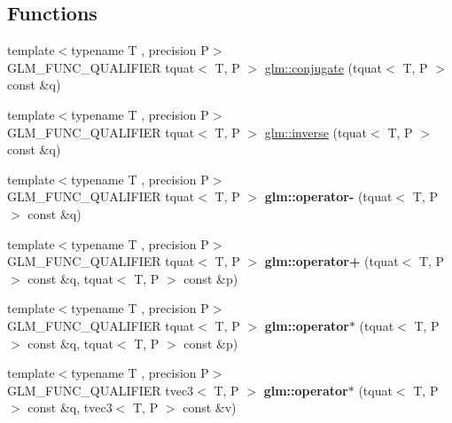 \subsection*{Functions}
\begin{DoxyCompactItemize}
\item 
{\footnotesize template$<$typename T , precision P$>$ }\\G\-L\-M\-\_\-\-F\-U\-N\-C\-\_\-\-Q\-U\-A\-L\-I\-F\-I\-E\-R tquat$<$ T, P $>$ \hyperlink{group__gtc__quaternion_gab1ace864fbf189ffa368950001808a3c}{glm\-::conjugate} (tquat$<$ T, P $>$ const \&q)
\item 
{\footnotesize template$<$typename T , precision P$>$ }\\G\-L\-M\-\_\-\-F\-U\-N\-C\-\_\-\-Q\-U\-A\-L\-I\-F\-I\-E\-R tquat$<$ T, P $>$ \hyperlink{group__gtc__quaternion_ga5f47300c024c2d809944e6ac661d6d14}{glm\-::inverse} (tquat$<$ T, P $>$ const \&q)
\item 
\hypertarget{group__gtc__quaternion_ga64cdb5fcebb192579798cfe79670239f}{{\footnotesize template$<$typename T , precision P$>$ }\\G\-L\-M\-\_\-\-F\-U\-N\-C\-\_\-\-Q\-U\-A\-L\-I\-F\-I\-E\-R tquat$<$ T, P $>$ {\bfseries glm\-::operator-\/} (tquat$<$ T, P $>$ const \&q)}\label{group__gtc__quaternion_ga64cdb5fcebb192579798cfe79670239f}

\item 
\hypertarget{group__gtc__quaternion_ga517657374d8ca180d63c33ff9430518a}{{\footnotesize template$<$typename T , precision P$>$ }\\G\-L\-M\-\_\-\-F\-U\-N\-C\-\_\-\-Q\-U\-A\-L\-I\-F\-I\-E\-R tquat$<$ T, P $>$ {\bfseries glm\-::operator+} (tquat$<$ T, P $>$ const \&q, tquat$<$ T, P $>$ const \&p)}\label{group__gtc__quaternion_ga517657374d8ca180d63c33ff9430518a}

\item 
\hypertarget{group__gtc__quaternion_gabca7455f687e322b505531e15786d845}{{\footnotesize template$<$typename T , precision P$>$ }\\G\-L\-M\-\_\-\-F\-U\-N\-C\-\_\-\-Q\-U\-A\-L\-I\-F\-I\-E\-R tquat$<$ T, P $>$ {\bfseries glm\-::operator$\ast$} (tquat$<$ T, P $>$ const \&q, tquat$<$ T, P $>$ const \&p)}\label{group__gtc__quaternion_gabca7455f687e322b505531e15786d845}

\item 
\hypertarget{group__gtc__quaternion_ga5b0cccc7f163f2b7bbf3536deb403d9a}{{\footnotesize template$<$typename T , precision P$>$ }\\G\-L\-M\-\_\-\-F\-U\-N\-C\-\_\-\-Q\-U\-A\-L\-I\-F\-I\-E\-R tvec3$<$ T, P $>$ {\bfseries glm\-::operator$\ast$} (tquat$<$ T, P $>$ const \&q, tvec3$<$ T, P $>$ const \&v)}\label{group__gtc__quaternion_ga5b0cccc7f163f2b7bbf3536deb403d9a}


\end{DoxyCompactItemize}
